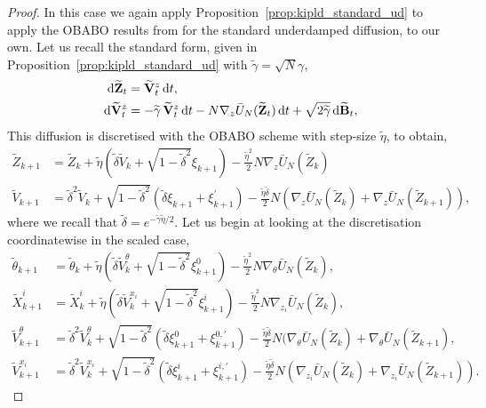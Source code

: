 \begin{proof}
In this case we again apply Proposition~\ref{prop:kipld_standard_ud} to apply the OBABO results from \citep{monmarche2021high} for the standard underdamped diffusion, to our own. Let us recall the standard form, given in Proposition~\ref{prop:kipld_standard_ud} with $\tilde{\gamma}=\sqrt{N}\gamma$,
\begin{align*}
{\mathrm d} \widetilde{{\mathbf Z}}_t &= \widetilde{{\mathbf V}}_t^z\,{\mathrm d} t, \\
{\mathrm d} \widetilde{{\mathbf V}}_t^z &= -\widetilde{\gamma}\,\widetilde{{\mathbf V}}_t^z\,{\mathrm d} t
- N\nabla_z \bar U_N(\widetilde{{\mathbf Z}}_t)\,{\mathrm d} t
+ \sqrt{2\widetilde{\gamma}}\,{\mathrm d} \widetilde{{\mathbf B}}_t,
\end{align*}
This diffusion is discretised with the OBABO scheme with step-size $\tilde{\eta}$, to obtain,
\small
\begin{align*}
\widetilde{Z}_{k+1} &= \widetilde{Z}_k + \tilde{\eta} \left(\tilde{\delta}\widetilde{V}_k + \sqrt{1-\tilde{\delta}^2}\xi_{k+1}\right)-\frac{\tilde{\eta}^2}{2} N\nabla_z\bar{U}_N(\widetilde{Z}_k)\\
\widetilde{V}_{k+1}&= \tilde{\delta}^2 \widetilde{V}_{k} + \sqrt{1-\tilde{\delta}^2} (\tilde{\delta}\xi_{k+1} + \xi^\prime_{k+1})-\frac{\tilde{\eta}\tilde{\delta}}{2} N (\nabla_z \bar{U}_N(\widetilde{Z}_k) + \nabla_z \bar{U}_N(\widetilde{Z}_{k+1})),
\end{align*}
\normalsize
where we recall that $\tilde{\delta}=e^{-\tilde{\gamma}\tilde{\eta}/2}$. Let us begin at looking at the discretisation coordinatewise in the scaled case,
\small
\begin{align*}
\widetilde{\theta}_{k+1} &= \widetilde{\theta}_k + \tilde{\eta}\left(\tilde{\delta} \widetilde{V}^\theta_{k} + \sqrt{1-\tilde{\delta}^2} \xi^0_{k+1}\right) - \frac{\tilde{\eta}^2}{2} N \nabla_\theta \bar{U}_N(\widetilde{Z}_k),\\
\widetilde{X}^i_{k+1} &= \widetilde{X}^i_k + \tilde{\eta}\left(\tilde{\delta} \widetilde{V}^{x_i}_{k} + \sqrt{1-\tilde{\delta}^2} \xi^i_{k+1}\right) - \frac{\tilde{\eta}^2}{2} N \nabla_{z_i} \bar{U}_N(\widetilde{Z}_k),\\
\widetilde{V}^\theta_{k+1} &= \tilde{\delta}^2 \widetilde{V}^\theta_k + \sqrt{1-\tilde{\delta}^2} (\tilde{\delta} \xi^0_{k+1} + \xi_{k+1}^{0,\prime}) - \frac{\tilde{\eta}\tilde{\delta}}{2} N(\nabla_\theta \bar{U}_N(\widetilde{Z}_k) + \nabla_\theta \bar{U}_N(\widetilde{Z}_{k+1}),\\
\widetilde{V}^{x_i}_{k+1} &= \tilde{\delta}^2 \widetilde{V}^{x_i}_k + \sqrt{1-\tilde{\delta}^2} (\tilde{\delta} \xi^i_{k+1} + \xi_{k+1}^{i,\prime}) - \frac{\tilde{\eta}\tilde{\delta}}{2} N(\nabla_{z_i} \bar{U}_N(\widetilde{Z}_k) + \nabla_{z_i} \bar{U}_N(\widetilde{Z}_{k+1})).

\end{align*}
\end{proof}
